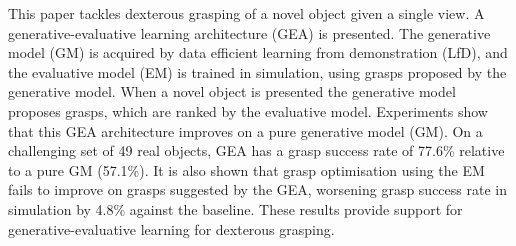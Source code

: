 This paper tackles dexterous grasping of a novel object given a single view. A generative-evaluative learning architecture (GEA) is presented. The generative model (GM) is acquired by data efficient learning from demonstration (LfD), and the evaluative model (EM) is trained in simulation, using grasps proposed by the generative model. When a novel object is presented the generative model proposes grasps, which are ranked by the evaluative model. Experiments show that this GEA architecture improves on a pure generative model (GM). On a challenging set of 49 real objects, GEA has a grasp success rate of 77.6\% relative to a pure GM (57.1\%). It is also shown that grasp optimisation using the EM fails to improve on grasps suggested by the GEA, worsening grasp success rate in simulation by 4.8\% against the baseline. These results provide support for generative-evaluative learning  for dexterous grasping.